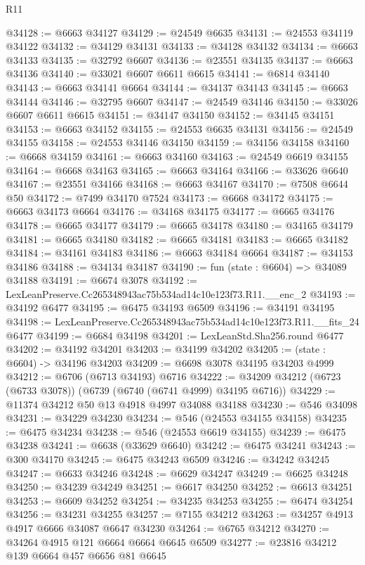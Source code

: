 \begin{lexlean}{R11}
\begin{coremodule}
@34128 := @6663 @34127
@34129 := @24549 @6635
@34131 := @24553 @34119 @34122
@34132 := @34129 @34131
@34133 := @34128 @34132
@34134 := @6663 @34133
@34135 := @32792 @6607
@34136 := @23551 @34135
@34137 := @6663 @34136
@34140 := @33021 @6607 @6611 @6615
@34141 := @6814 @34140
@34143 := @6663 @34141 @6664
@34144 := @34137 @34143
@34145 := @6663 @34144
@34146 := @32795 @6607
@34147 := @24549 @34146
@34150 := @33026 @6607 @6611 @6615
@34151 := @34147 @34150
@34152 := @34145 @34151
@34153 := @6663 @34152
@34155 := @24553 @6635 @34131
@34156 := @24549 @34155
@34158 := @24553 @34146 @34150
@34159 := @34156 @34158
@34160 := @6668 @34159
@34161 := @6663 @34160
@34163 := @24549 @6619 @34155
@34164 := @6668 @34163
@34165 := @6663 @34164
@34166 := @33626 @6640
@34167 := @23551 @34166
@34168 := @6663 @34167
@34170 := @7508 @6644 @50
@34172 := @7499 @34170 @7524
@34173 := @6668 @34172
@34175 := @6663 @34173 @6664
@34176 := @34168 @34175
@34177 := @6665 @34176
@34178 := @6665 @34177
@34179 := @6665 @34178
@34180 := @34165 @34179
@34181 := @6665 @34180
@34182 := @6665 @34181
@34183 := @6665 @34182
@34184 := @34161 @34183
@34186 := @6663 @34184 @6664
@34187 := @34153 @34186
@34188 := @34134 @34187
@34190 := fun (state : @6604) => @34089 @34188
@34191 := @6674 @3078
@34192 := LexLeanPreserve.Cc265348943ac75b534ad14c10e123f73.R11.__enc_2
@34193 := @34192 @6477
@34195 := @6475 @34193 @6509
@34196 := @34191 @34195
@34198 := LexLeanPreserve.Cc265348943ac75b534ad14c10e123f73.R11.__fits_24 @6477
@34199 := @6684 @34198
@34201 := LexLeanStd.Sha256.round @6477
@34202 := @34192 @34201
@34203 := @34199 @34202
@34205 := (state : @6604) -> @34196 @34203
@34209 := @6698 @3078 @34195 @34203 @4999
@34212 := @6706 (@6713 @34193) @6716
@34222 := @34209 @34212 (@6723 (@6733 @3078)) (@6739 (@6740 (@6741 @4999) @34195 @6716))
@34229 := @11374 @34212 @50 @13 @4918 @4997 @34088 @34188
@34230 := @546 @34098
@34231 := @34229 @34230
@34234 := @546 (@24553 @34155 @34158)
@34235 := @6475 @34234
@34238 := @546 (@24553 @6619 @34155)
@34239 := @6475 @34238
@34241 := @6638 (@33629 @6640)
@34242 := @6475 @34241
@34243 := @300 @34170
@34245 := @6475 @34243 @6509
@34246 := @34242 @34245
@34247 := @6633 @34246
@34248 := @6629 @34247
@34249 := @6625 @34248
@34250 := @34239 @34249
@34251 := @6617 @34250
@34252 := @6613 @34251
@34253 := @6609 @34252
@34254 := @34235 @34253
@34255 := @6474 @34254
@34256 := @34231 @34255
@34257 := @7155 @34212
@34263 := @34257 @4913 @4917 @6666 @34087 @6647 @34230
@34264 := @6765 @34212
@34270 := @34264 @4915 @121 @6664 @6664 @6645 @6509
@34277 := @23816 @34212 @139 @6664 @457 @6656 @81 @6645

\end{coremodule}
\end{lexlean}
